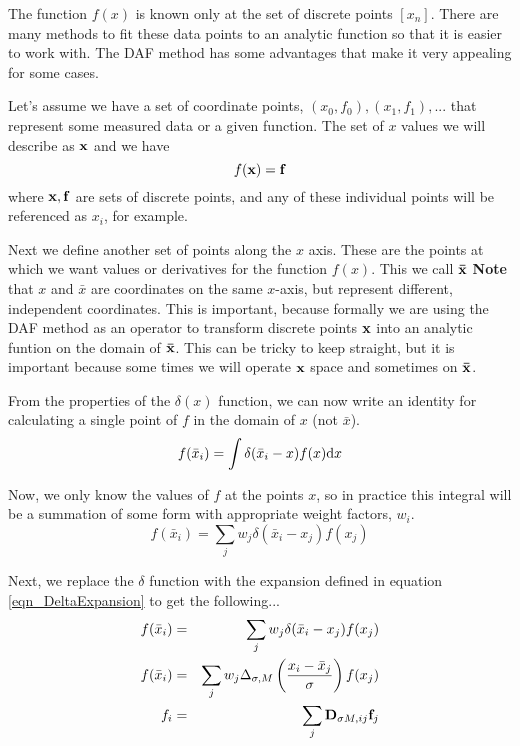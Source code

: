 \documentclass[preprint]{revtex4}
\begin{document}
The function $f(x)$ is known only at the set of discrete points $[x_n]$.
There are many methods to fit these data points to an analytic function so that it is
easier to work with. The DAF method has some advantages that make it very appealing
for some cases. 


Let's assume we have a set of coordinate points, $(x_0,f_0),(x_1,f_1),...$ that represent
some measured data or a given function. The set of $x$ values we will describe as ${\bf x}$
and we have
\begin{equation*}
f({\bf x}) = {\bf f}
\end{equation*}
where ${\bf x, f}$ are sets of discrete points, and any of these individual points will
be referenced as $x_i$, for example. 

Next we define another set of points along the $x$ axis. These are the points at which
we want values or derivatives for the function $f(x)$. This we call ${\bf \bar{x}}$
{\bf Note} that $x$ and $\bar{x}$ are coordinates on the same $x$-axis, but represent
different, independent coordinates. This is important, because formally we are using
the DAF method as an operator to transform discrete points $\bf{x}$ into an analytic
funtion on the domain of $\bf{\bar{x}}$. This can be tricky to keep straight, but it
is important because some times we will operate $\bf{x}$ space and sometimes on $\bf{\bar{x}}$. 

From the properties of the $\delta(x)$ function, we can now write an identity for
calculating a single point of $f$ in the domain of $x$ (not $\bar{x}$). 
\begin{equation}
\label{eqn_fdelt_ident}
f(\bar{x}_i) = \int\delta(\bar{x}_i-x)f(x){\rm d}x
\end{equation}

Now, we only know the values of $f$ at the points $x$, so in practice this integral
will be a summation of some form with appropriate weight factors, $w_i$. 
\begin{equation}
\label{eqn_fdelt_sum}
f(\bar{x}_i) = \sum_j w_j \delta(\bar{x}_i-x_j)f(x_j)
\end{equation}

Next, we replace the $\delta$ function with the expansion defined in equation 
\ref{eqn_DeltaExpansion} to get the following...
\begin{eqnarray}
f(\bar{x}_i) &=& \sum_j w_j \delta(\bar{x}_i-x_j)f(x_j) \\
f(\bar{x}_i) &=& \sum_j w_j \Delta_{\sigma,M}\left(\frac{x_i-\bar{x}_j}{\sigma}\right)f(x_j) \\
f_i & = &  \sum_j {\bf D}_{\sigma M,ij} {\bf f}_j
\end{eqnarray}
\end{document}

